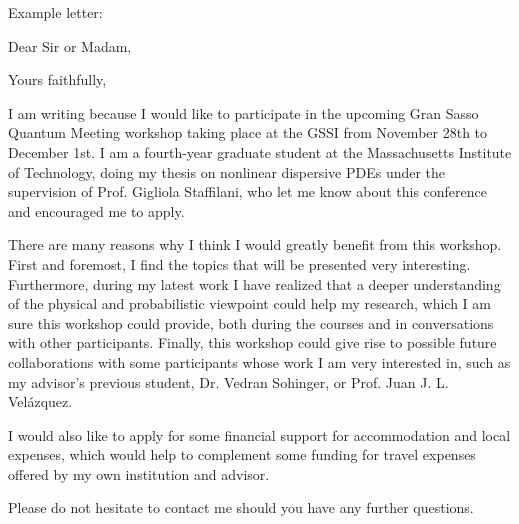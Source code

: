 %
%

Example letter:
\date{\today}
\opening{Dear Sir or Madam,}
\closing{Yours faithfully,}
\makelettertitle

I am writing because I would like to participate in the upcoming Gran Sasso Quantum Meeting workshop taking place at the GSSI from November 28th to December 1st. I am a fourth-year graduate student at the Massachusetts Institute of Technology, doing my thesis on nonlinear dispersive PDEs under the supervision of Prof. Gigliola Staffilani, who let me know about this conference and encouraged me to apply.

There are many reasons why I think I would greatly benefit from this workshop.
First and foremost, I find the topics that will be presented very interesting. 
Furthermore, during my latest work I have realized that a deeper understanding of the physical and probabilistic viewpoint 
could help my research, which I am sure this workshop could provide, both during the courses and in conversations with other participants.
Finally, this workshop could give rise to possible future collaborations with some participants whose work I am very interested in, such as my advisor's previous student, Dr. Vedran Sohinger, or Prof. Juan J. L. Vel\'azquez.

I would also like to apply for some financial support for accommodation and local expenses, which would help to complement some funding for travel expenses offered by my own institution and advisor.

Please do not hesitate to contact me should you have any further questions.

\makeletterclosing

\clearpage

